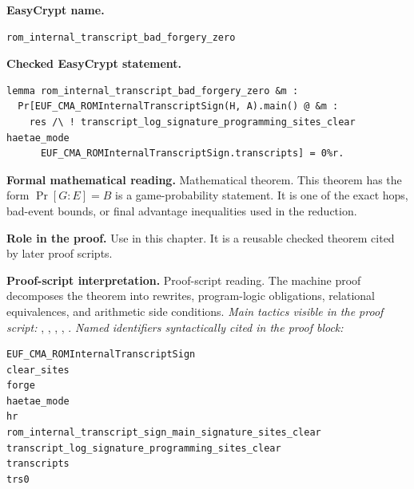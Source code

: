 \begin{formaltheorem}
\noindent\textbf{EasyCrypt name.}
\begin{lstlisting}[language=EasyCrypt,basicstyle=\ttfamily\scriptsize]
rom_internal_transcript_bad_forgery_zero
\end{lstlisting}
\noindent\textbf{Checked EasyCrypt statement.}
\begin{lstlisting}[language=EasyCrypt,basicstyle=\ttfamily\scriptsize]
lemma rom_internal_transcript_bad_forgery_zero &m :
  Pr[EUF_CMA_ROMInternalTranscriptSign(H, A).main() @ &m :
    res /\ ! transcript_log_signature_programming_sites_clear haetae_mode
      EUF_CMA_ROMInternalTranscriptSign.transcripts] = 0%r.
\end{lstlisting}
\noindent\textbf{Formal mathematical reading.}
Mathematical theorem. This theorem has the form \(\Pr[G:E] = B\) is a game-probability statement.  It is one of the exact hops, bad-event bounds, or final advantage inequalities used in the reduction.

\noindent\textbf{Role in the proof.}
Use in this chapter. It is a reusable checked theorem cited by later proof scripts.

\noindent\textbf{Proof-script interpretation.}
Proof-script reading. The machine proof decomposes the theorem into rewrites, program-logic obligations, relational equivalences, and arithmetic side conditions.
\emph{Main tactics visible in the proof script:} , , , , .
\emph{Named identifiers syntactically cited in the proof block:}
\begin{lstlisting}[language=EasyCrypt,basicstyle=\ttfamily\scriptsize]
EUF_CMA_ROMInternalTranscriptSign
clear_sites
forge
haetae_mode
hr
rom_internal_transcript_sign_main_signature_sites_clear
transcript_log_signature_programming_sites_clear
transcripts
trs0
\end{lstlisting}

\end{formaltheorem}

